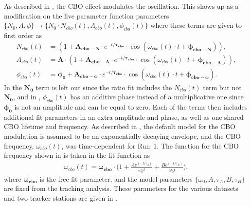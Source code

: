 As described in , the CBO effect modulates the \wa oscillation. This shows up as a modification on the five parameter function parameters $\{N_{0}, A, \phi\} \rightarrow \{N_{0} \cdot N_{cbo}(t), A_{cbo}(t), \phi_{cbo}(t)\}$ where these terms are given to first order as
    \begin{align}
        N_{cbo}(t) &= (1 + \boldsymbol{A_{cbo-N}} \cdot e^{-t/\boldsymbol{\tau_{cbo}}} \cdot \cos(\omega_{cbo}(t) \cdot t + \boldsymbol{\phi_{cbo-N}})), \label{eq:Ncbo} \\ 
        A_{cbo}(t) &= \boldsymbol{A} \cdot (1 + \boldsymbol{A_{cbo-A}} \cdot e^{-t/\boldsymbol{\tau_{cbo}}} \cdot \cos(\omega_{cbo}(t) \cdot t + \boldsymbol{\phi_{cbo-A}})), \label{eq:Acbo} \\ 
        \phi_{cbo}(t) &= \boldsymbol{\phi_{0}} + \boldsymbol{A_{cbo-\phi}} \cdot e^{-t/\boldsymbol{\tau_{cbo}}} \cdot \cos(\omega_{cbo}(t) \cdot t + \boldsymbol{\phi_{cbo-\phi}}). \label{eq:Phicbo}
    \end{align}
In  the $\boldsymbol{N_{0}}$ term is left out since the ratio fit includes the $N_{cbo}(t)$ term but not $\boldsymbol{N_{0}}$, and in , $\phi_{cbo}(t)$ has an additive phase instead of a multiplicative one since $\boldsymbol{\phi_{0}}$ is not an amplitude and can be equal to zero. Each of the terms then includes additional fit parameters in an extra amplitude and phase, as well as one shared CBO lifetime and frequency. As described in , the default model for the CBO modulation is assumed to be an exponentially decaying envelope, and the CBO frequency, $\omega_{cbo}(t)$, was time-dependent for Run~1. The function for the CBO frequency shown in  is taken in the fit function as
    \begin{align} \label{eq:CBOfreqForm}
        \omega_{cbo}(t) = \boldsymbol{\omega_{cbo}} \cdot \Big(1 + \frac{Ae^{(-t/\tau_{A})}}{\omega_{0}t} + \frac{Be^{(-t/\tau_{B})}}{\omega_{0}t}\Big),
    \end{align}
where $\boldsymbol{\omega_{cbo}}$ is the free fit parameter, and the model parameters $\{\omega_{0}, A, \tau_{A}, B, \tau_{B}\}$ are fixed from the tracking analysis. These parameters for the various datasets and two tracker stations are given in . 




